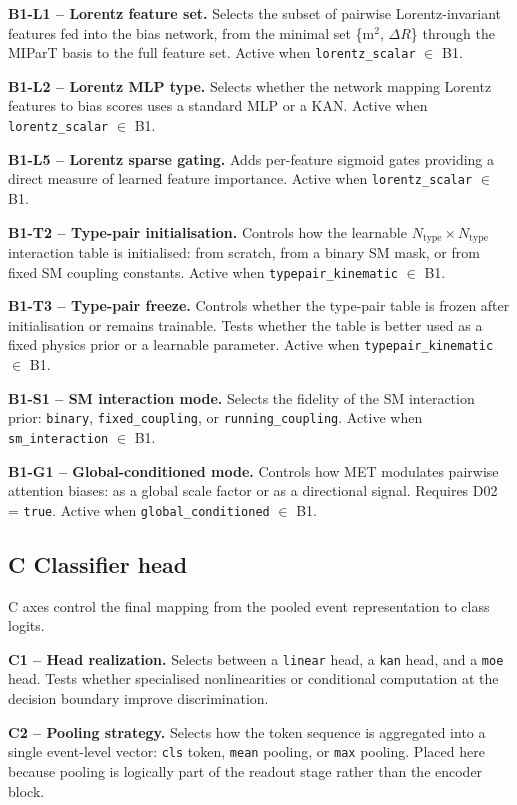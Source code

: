 \textbf{B1-L1 -- Lorentz feature set.} Selects the subset of pairwise
Lorentz-invariant features fed into the bias network, from the minimal
set \{m$^2$, $\Delta R$\} through the MIParT basis to the full feature
set. Active when \texttt{lorentz\_scalar} $\in$ B1.

\textbf{B1-L2 -- Lorentz MLP type.} Selects whether the network
mapping Lorentz features to bias scores uses a standard MLP or a KAN.
Active when \texttt{lorentz\_scalar} $\in$ B1.

\textbf{B1-L5 -- Lorentz sparse gating.} Adds per-feature sigmoid
gates providing a direct measure of learned feature importance. Active
when \texttt{lorentz\_scalar} $\in$ B1.

\textbf{B1-T2 -- Type-pair initialisation.} Controls how the learnable
$N_\text{type} \times N_\text{type}$ interaction table is initialised:
from scratch, from a binary SM mask, or from fixed SM coupling
constants. Active when \texttt{typepair\_kinematic} $\in$ B1.

\textbf{B1-T3 -- Type-pair freeze.} Controls whether the type-pair
table is frozen after initialisation or remains trainable. Tests
whether the table is better used as a fixed physics prior or a
learnable parameter. Active when \texttt{typepair\_kinematic} $\in$ B1.

\textbf{B1-S1 -- SM interaction mode.} Selects the fidelity of the SM
interaction prior: \texttt{binary}, \texttt{fixed\_coupling}, or
\texttt{running\_coupling}. Active when \texttt{sm\_interaction}
$\in$ B1.

\textbf{B1-G1 -- Global-conditioned mode.} Controls how MET modulates
pairwise attention biases: as a global scale factor or as a directional
signal. Requires D02 = \texttt{true}. Active when
\texttt{global\_conditioned} $\in$ B1.

\subsection*{C \quad Classifier head}

C axes control the final mapping from the pooled event representation
to class logits.

\textbf{C1 -- Head realization.} Selects between a \texttt{linear}
head, a \texttt{kan} head, and a \texttt{moe} head. Tests whether
specialised nonlinearities or conditional computation at the decision
boundary improve discrimination.

\textbf{C2 -- Pooling strategy.} Selects how the token sequence is
aggregated into a single event-level vector: \texttt{cls} token,
\texttt{mean} pooling, or \texttt{max} pooling. Placed here because
pooling is logically part of the readout stage rather than the encoder
block.

